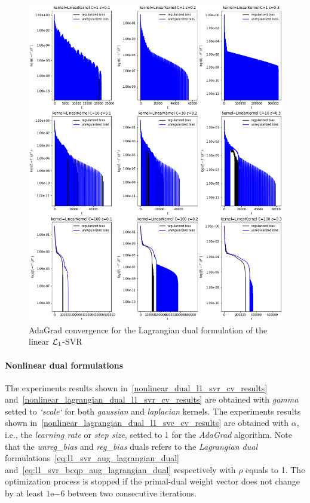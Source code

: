 



\begin{figure}[H]
	\centering
	\includegraphics[scale=0.55]{img/linear_lagrangian_dual_l1_svr_loss_history}
	\caption{AdaGrad convergence for the Lagrangian dual formulation of the linear $\protect \mathcal{L}_1$-SVR}
	\label{fig:linear_lagrangian_dual_l1_svr_loss_history}
\end{figure}

\paragraph{Nonlinear dual formulations}

The experiments results shown in~\ref{nonlinear_dual_l1_svr_cv_results} and~\ref{nonlinear_lagrangian_dual_l1_svr_cv_results} are obtained with \emph{gamma} setted to \emph{`scale`} for both \emph{gaussian} and \emph{laplacian} kernels. The experiments results shown in~\ref{nonlinear_lagrangian_dual_l1_svc_cv_results} are obtained with $\alpha$, i.e., the \emph{learning rate} or \emph{step size}, setted to 1 for the \emph{AdaGrad} algorithm. Note that the \emph{unreg\_bias} and \emph{reg\_bias} duals refers to the \emph{Lagrangian dual} formulations~\eqref{eq:l1_svr_aug_lagrangian_dual} and~\eqref{eq:l1_svr_bcqp_aug_lagrangian_dual} respectively with $\rho$ equals to 1. The optimization process is stopped if the primal-dual weight vector does not change by at least $1\mathrm{e}{-6}$  between two consecutive iterations.

